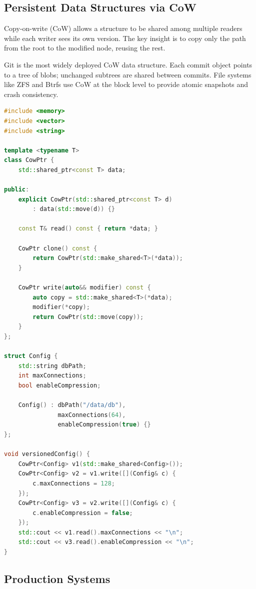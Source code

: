 \subsection{Persistent Data Structures via CoW}

Copy-on-write (CoW) allows a structure to be shared among multiple readers while
each writer sees its own version.  The key insight is to copy only the path from the
root to the modified node, reusing the rest.

Git is the most widely deployed CoW data structure.  Each commit object points to a
tree of blobs; unchanged subtrees are shared between commits.  File systems like ZFS
and Btrfs use CoW at the block level to provide atomic snapshots and crash
consistency.

\begin{lstlisting}[language=C++]
#include <memory>
#include <vector>
#include <string>

template <typename T>
class CowPtr {
    std::shared_ptr<const T> data;

public:
    explicit CowPtr(std::shared_ptr<const T> d)
        : data(std::move(d)) {}

    const T& read() const { return *data; }

    CowPtr clone() const {
        return CowPtr(std::make_shared<T>(*data));
    }

    CowPtr write(auto&& modifier) const {
        auto copy = std::make_shared<T>(*data);
        modifier(*copy);
        return CowPtr(std::move(copy));
    }
};

struct Config {
    std::string dbPath;
    int maxConnections;
    bool enableCompression;

    Config() : dbPath("/data/db"),
               maxConnections(64),
               enableCompression(true) {}
};

void versionedConfig() {
    CowPtr<Config> v1(std::make_shared<Config>());
    CowPtr<Config> v2 = v1.write([](Config& c) {
        c.maxConnections = 128;
    });
    CowPtr<Config> v3 = v2.write([](Config& c) {
        c.enableCompression = false;
    });
    std::cout << v1.read().maxConnections << "\n";
    std::cout << v3.read().enableCompression << "\n";
}
\end{lstlisting}

\subsection{Production Systems}

